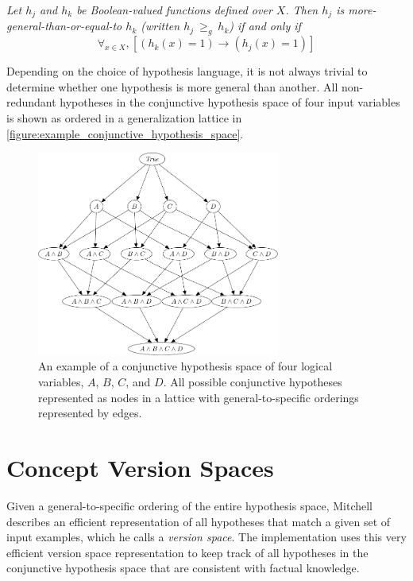 \begin{definition}
\emph{Let $h_j$ and $h_k$ be Boolean-valued functions defined over
  $X$. Then $h_j$ is more-general-than-or-equal-to $h_k$ (written
  $h_j\ \geq_g\ h_k$) if and only if
\begin{equation*}
\forall_{x \in X}, [(h_k(x) = 1) \rightarrow (h_j(x) = 1)]
\end{equation*}
}\end{definition}

Depending on the choice of hypothesis language, it is not always
trivial to determine whether one hypothesis is more general than
another.  All non-redundant hypotheses in the conjunctive hypothesis
space of four input variables is shown as ordered in a generalization
lattice in
{\mbox{\autoref{figure:example_conjunctive_hypothesis_space}}}.
\begin{figure}
\center
\includegraphics[width=8cm]{gfx/example_conjunctive_hypothesis_space}
\caption[An example of a conjunctive hypothesis space.]{An example of
  a conjunctive hypothesis space of four logical variables, $A$, $B$,
  $C$, and $D$.  All possible conjunctive hypotheses represented as
  nodes in a lattice with general-to-specific orderings represented by
  edges.}
\label{figure:example_conjunctive_hypothesis_space}
\end{figure}

\section{Concept Version Spaces}

Given a general-to-specific ordering of the entire hypothesis space,
Mitchell describes an efficient representation of all hypotheses that
match a given set of input examples, which he calls a \emph{version
  space}.  The implementation uses this very efficient version space
representation to keep track of all hypotheses in the conjunctive
hypothesis space that are consistent with factual knowledge.

